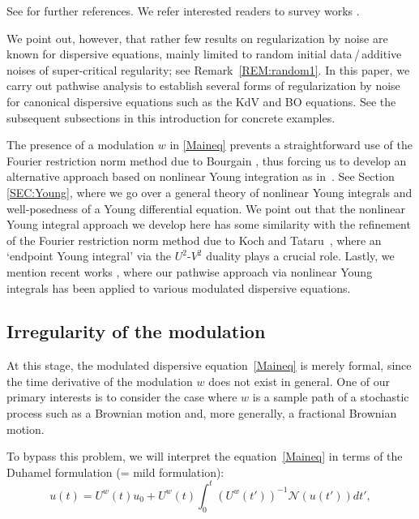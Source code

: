 \documentclass[letterpaper, 11pt,  reqno]{amsart}
\newcommand{\1}{\hspace{0.5mm}\text{I}\hspace{0.5mm}}
\newcommand{\noi}{\noindent}
\newcommand{\NN}{\mathcal{N}}
\numberwithin{equation}{section}
\numberwithin{theorem}{section}
\begin{document}
\noi
See \cite{RT} for further references.
We refer interested readers to  survey works \cite{Flan, Gess}.

We point out, however, that  rather few results 
on regularization by noise are known
for  dispersive equations, mainly limited to random initial data\,/\,additive noises of super-critical regularity;
see Remark~\ref{REM:random1}.
In this paper, we carry out pathwise analysis to establish several forms of  regularization by noise
for canonical dispersive equations
such as the KdV and BO equations.
See the subsequent subsections
in this introduction
for concrete examples.





The presence of a modulation $w$ in \eqref{Maineq} prevents  
a straightforward use of the Fourier restriction norm method
due to Bourgain \cite{BO93}, 
thus forcing us  
 to develop an alternative approach based on nonlinear Young integration as in~\cite{CG1}.  
See Section \ref{SEC:Young}, 
where we go over a general theory of nonlinear Young integrals
and well-posedness of a Young differential equation.
We point out that 
the nonlinear Young integral approach
we develop here
has 
some  similarity 
with 
the refinement of the Fourier restriction norm method
due to Koch and Tataru~\cite{KT}, 
where an `endpoint Young integral' via the $U^2$-$V^2$ duality
plays a crucial role.
Lastly, we mention recent works
\cite{Robert1, Tanaka, Robert2, Robert3}, 
where our pathwise approach via nonlinear Young integrals
has been applied to various modulated dispersive equations.





\subsection{Irregularity of the modulation}

At this stage, 
the modulated dispersive equation~\eqref{Maineq} 
is merely formal, since the time derivative of the modulation  $w$ does not exist in general.
One of our primary interests
is to  consider the  case where $w$ is a sample path of a stochastic process
such as a Brownian motion and, more generally,  a fractional Brownian motion. 

To bypass this problem, 
 we will interpret the equation~\eqref{Maineq} in terms of the 
 Duhamel formulation (= mild formulation):
\begin{equation}
u(t) = U^w(t) u_0 +  U^w({t}) \int_0^t  (U^w({t'}))^{-1}\NN( u(t') ) dt', 
\label{mild1}
\end{equation}
\end{document}
